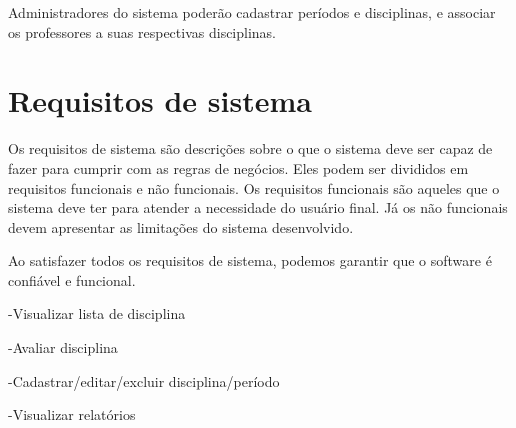 Administradores do sistema poderão cadastrar períodos e disciplinas, e associar os professores a suas respectivas disciplinas. 

\section{Requisitos de sistema}
Os requisitos de sistema são descrições sobre o que o sistema deve ser capaz de fazer para cumprir com as regras de negócios. Eles podem ser divididos em requisitos funcionais e não funcionais. Os requisitos funcionais são aqueles que o sistema deve ter para atender a necessidade do usuário final. Já os não funcionais devem apresentar as limitações do sistema desenvolvido.

Ao satisfazer todos os requisitos de sistema, podemos garantir que o software é confiável e funcional.

-Visualizar lista de disciplina

-Avaliar disciplina

-Cadastrar/editar/excluir disciplina/período

-Visualizar relatórios

